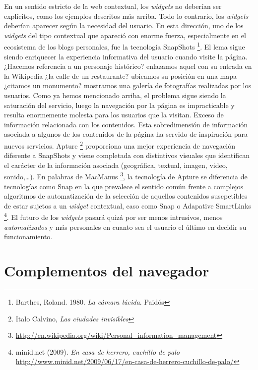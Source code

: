 \documentclass[12pt, a4paper,twoside]{book}
\begin{document}
En un sentido estricto de la web contextual, los \emph{widgets} no
deberían ser explícitos, como los ejemplos descritos más arriba.
Todo lo contrario, los \emph{widgets} deberían aparecer según la
necesidad del usuario. En esta dirección, uno de los \emph{widgets}
del tipo contextual que apareció con enorme fuerza, especialmente
en el ecosistema de los blogs personales, fue la tecnología
SnapShots%
\footnote{Barthes, Roland. 1980. \emph{La cámara lúcida}. Paidós}.
El lema sigue siendo enriquecer la experiencia informativa del
usuario cuando visite la página. ¿Hacemos referencia a un personaje
histórico? enlazamos aquel con su entrada en la Wikipedia ¿la calle
de un restaurante? ubicamos su posición en una mapa ¿citamos un
monumento? mostramos una galería de fotografías realizadas por los
usuarios. Como ya hemos mencionado arriba, el problema sigue siendo
la saturación del servicio, luego la navegación por la página es
impracticable y resulta enormemente molesta para los usuarios que
la visitan. Exceso de información relacionada con los contenidos.
Esta sobredimensión de información asociada a algunos de los
contenidos de la página ha servido de inspiración para nuevos
servicios. Apture%
\footnote{Italo Calvino, \emph{Las ciudades invisibles}}
proporciona una mejor experiencia de navegación diferente a
SnapShots y viene completada con distintivos visuales que
identifican el carácter de la información asociada (geográfica,
textual, imagen, video, sonido,\ldots{}). En palabras de MacManus%
\footnote{\href{http://en.wikipedia.org/wiki/Personal_information_management}{http://en.wikipedia.org/wiki/Personal\_information\_management}},
la tecnología de Apture se diferencia de tecnologías como Snap en
la que prevalece el sentido común frente a complejos algoritmos de
automatización de la selección de aquellos contenidos suscpetibles
de estar sujetos a un \emph{widget} contextual, caso como Snap o
Adapative SmartLinks%
\footnote{minid.net (2009). \emph{En casa de herrero, cuchillo de palo}
\href{http://www.minid.net/2009/06/17/en-casa-de-herrero-cuchillo-de-palo/}{http://www.minid.net/2009/06/17/en-casa-de-herrero-cuchillo-de-palo/}}.
El futuro de los \emph{widgets} pasará quizá por ser menos
intrusivos, menos \emph{automatizados} y más personales en cuanto
sea el usuario el último en decidir su funcionamiento.

\section{Complementos del navegador}
\end{document}

